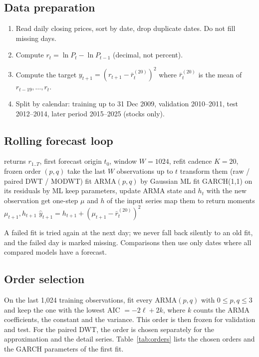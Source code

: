 \documentclass{article}
\begin{document}
\subsection{Data preparation}
\begin{enumerate}
\item Read daily closing prices, sort by date, drop duplicate dates. Do not fill missing days.
\item Compute $r_t=\ln P_t-\ln P_{t-1}$ (decimal, not percent).
\item Compute the target $y_{t+1}=(r_{t+1}-\bar r^{(20)}_t)^2$ where $\bar r^{(20)}_t$ is the mean of $r_{t-19},\dots,r_t$.
\item Split by calendar: training up to 31 Dec 2009, validation 2010--2011, test 2012--2014, later period 2015--2025 (stocks only).
\end{enumerate}

\subsection{Rolling forecast loop}

\begin{algorithm}[h]
\caption{Rolling one-step forecast for one model}
\begin{algorithmic}
 returns $r_{1..T}$, first forecast origin $t_0$, window $W=1024$, refit cadence $K=20$, frozen order $(p,q)$
\STATE take the last $W$ observations up to $t$
\STATE transform them (raw / paired DWT / MODWT)
\STATE fit ARMA$(p,q)$ by Gaussian ML
\STATE fit GARCH(1,1) on its residuals by ML
\ELSE
\STATE keep parameters, update ARMA state and $h_t$ with the new observation
\ENDIF
\STATE get one-step $\mu$ and $h$ of the input series
\STATE map them to return moments $\mu_{t+1},h_{t+1}$
\STATE $\hat y_{t+1}=h_{t+1}+(\mu_{t+1}-\bar r^{(20)}_t)^2$
\ENDFOR
\end{algorithmic}
\end{algorithm}

A failed fit is tried again at the next day; we never fall back silently to an old fit, and the failed day is marked missing. Comparisons then use only dates where all compared models have a forecast.

\subsection{Order selection}
On the last 1,024 training observations, fit every ARMA$(p,q)$ with $0\le p,q\le3$ and keep the one with the lowest AIC $=-2\ell+2k$, where $k$ counts the ARMA coefficients, the constant and the variance. This order is then frozen for validation and test. For the paired DWT, the order is chosen separately for the approximation and the detail series. Table~\ref{tab:orders} lists the chosen orders and the GARCH parameters of the first fit.
\end{document}
